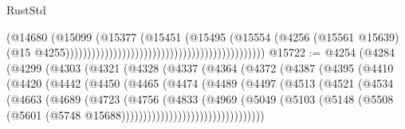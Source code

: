 \begin{lexlean}{RustStd}
\begin{coremodule}
                                                                                (@14680
                                                                                  (@15099
                                                                                    (@15377
                                                                                      (@15451
                                                                                        (@15495
                                                                                          (@15554
                                                                                            (@4256
                                                                                              (@15561
                                                                                                @15639)
                                                                                              (@15
                                                                                                @4255))))))))))))))))))))))))))))))))))))))))))))))
@15722 := @4254
    (@4284
      (@4299
        (@4303
          (@4321
            (@4328
              (@4337
                (@4364
                  (@4372
                    (@4387
                      (@4395
                        (@4410
                          (@4420
                            (@4442
                              (@4450
                                (@4465
                                  (@4474
                                    (@4489
                                      (@4497
                                        (@4513
                                          (@4521
                                            (@4534
                                              (@4663
                                                (@4689
                                                  (@4723
                                                    (@4756
                                                      (@4833
                                                        (@4969
                                                          (@5049
                                                            (@5103
                                                              (@5148
                                                                (@5508
                                                                  (@5601
                                                                    (@5748
                                                                      @15688)))))))))))))))))))))))))))))))))

\end{coremodule}
\end{lexlean}
